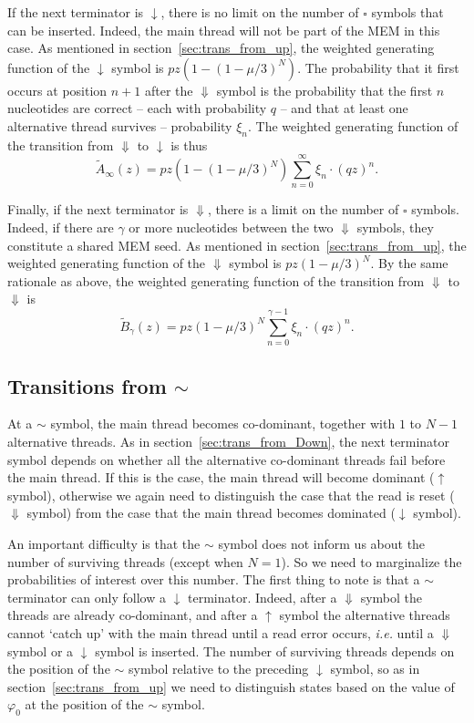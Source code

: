 \documentclass{article}
\begin{document}
If the next terminator is $\downarrow$, there is no limit on the number of
$\square$ symbols that can be inserted. Indeed, the main thread will not
be part of the MEM in this case. As mentioned in
section~\ref{sec:trans_from_up}, the weighted generating function of the
$\downarrow$ symbol is $pz(1-(1-\mu/3)^N)$. The probability that it first
occurs at position $n+1$ after the $\Downarrow$ symbol is the probability
that the first $n$ nucleotides are correct -- each with probability $q$
-- and that at least one alternative thread survives -- probability
$\xi_n$. The weighted generating function of the transition from
$\Downarrow$ to $\downarrow$ is thus
\begin{equation}
\tilde{A}_\infty(z) = pz(1-(1-\mu/3)^N)
  \sum_{n=0}^\infty \xi_n \cdot (qz)^n.
\end{equation}


Finally, if the next terminator is $\Downarrow$, there is a limit on the
number of $\square$ symbols. Indeed, if there are $\gamma$ or more
nucleotides between the two $\Downarrow$ symbols, they constitute a shared
MEM seed. As mentioned in section~\ref{sec:trans_from_up}, the weighted
generating function of the $\Downarrow$ symbol is $pz(1-\mu/3)^N$. By the
same rationale as above, the weighted generating function of the
transition from $\Downarrow$ to $\Downarrow$ is
\begin{equation}
\tilde{B}_{\gamma}(z) = pz(1-\mu/3)^N
  \sum_{n=0}^{\gamma-1} \xi_n \cdot (qz)^n.
\end{equation}


\subsection{Transitions from $\sim$}

At a $\sim$ symbol, the main thread becomes co-dominant, together with $1$
to $N-1$ alternative threads. As in section~\ref{sec:trans_from_Down}, the
next terminator symbol depends on whether all the alternative co-dominant
threads fail before the main thread. If this is the case, the main thread
will become dominant ($\uparrow$ symbol), otherwise we again need to
distinguish the case that the read is reset ($\Downarrow$ symbol) from the
case that the main thread becomes dominated ($\downarrow$ symbol).

An important difficulty is that the $\sim$ symbol does not inform us about
the number of surviving threads (except when $N = 1$). So we need to
marginalize the probabilities of interest over this number. The first
thing to note is that a $\sim$ terminator can only follow a $\downarrow$
terminator. Indeed, after a $\Downarrow$ symbol the threads are already
co-dominant, and after a $\uparrow$ symbol the alternative threads cannot
`catch up' with the main thread until a read error occurs, \textit{i.e.}
until a $\Downarrow$ symbol or a $\downarrow$ symbol is inserted. The
number of surviving threads depends on the position of the $\sim$ symbol
relative to the preceding $\downarrow$ symbol, so as in
section~\ref{sec:trans_from_up} we need to distinguish states based on the
value of $\varphi_0$ at the position of the $\sim$ symbol.
\end{document}
